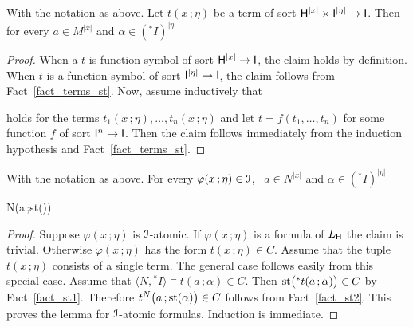 \documentclass[10pt,oneside]{amsproc}
\begin{document}
\begin{fact}\label{fact_st2} 
  With the notation as above.
  Let $t(x\,;\eta)$ be a term of sort ${\sf H}^{|x|}\times{\sf I}^{|\eta|}\to {\sf I}$.
  Then for every $a\in M^{|x|}$ and $\alpha\in({}^*\!I)^{|\eta|}$

\end{fact}
\begin{proof}
  When a $t$ is function symbol of sort  ${\sf H}^{|x|}\to {\sf I}$, the claim holds by definition.
  When $t$ is a function symbol of sort ${\sf I}^{|\eta|}\to {\sf I}$, the claim follows from Fact~\ref{fact_terms_st}.
  Now, assume inductively that 


  holds for the terms $t_1(x\,;\eta),\dots,t_n(x\,;\eta)$ and let $t=f(t_1,\dots,t_n)$ for some function $f$ of sort ${\sf I}^n\to {\sf I}$.
  Then the claim follows immediately from the induction hypothesis and Fact~\ref{fact_terms_st}.
\end{proof}


\begin{lemma}\label{lem_st}
  With the notation as above.
  For every $\varphi(x\,;\eta)\in{\EuScript I}$, \  $a\in N^{|x|}$ and $\alpha\in({}^*\!I)^{|\eta|}$ 
  
  {\Rightarrow}
  {N\models\varphi\big(a\,;{\rm st}(\alpha)\big)}
\end{lemma}

\begin{proof}
  Suppose $\varphi(x\,;\eta)$ is ${\EuScript I}$-atomic.
  If $\varphi(x\,;\eta)$ is a formula of $L_{\sf H}$ the claim is trivial. 
  Otherwise $\varphi(x\,;\eta)$ has the form $t(x\,;\eta)\in C$.
  Assume that the tuple $t(x\,;\eta)$ consists of a single term.
  The general case follows easily from this special case. 
  Assume that $\langle N,{}^*\!I\rangle\models t(a\,;\alpha)\in C$.
  Then ${\rm st}\big({}^*t(a\,;\alpha)\big)\in C$ by Fact~\ref{fact_st1}.
  Therefore $t^N\big(a\,;{\rm st}(\alpha)\big)\in C$ follows from Fact~\ref{fact_st2}.
  This proves the lemma for ${\EuScript I}$-atomic formulas.
  Induction is immediate. 
\end{proof}
\end{document}
